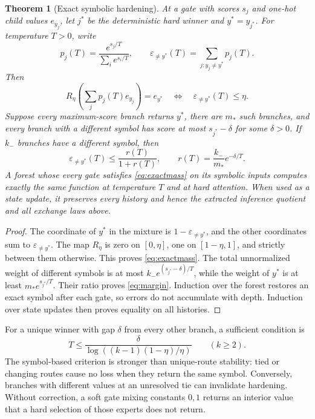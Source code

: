\documentclass{article}
\newtheorem{theorem}{Theorem}
\theoremstyle{definition}
\newcommand{\eps}{\varepsilon}
\begin{document}
\begin{theorem}[Exact symbolic hardening]\label{thm:hardening}
At a gate with scores $s_j$ and one-hot child values $e_{y_j}$, let $j^*$ be the deterministic hard winner and $y^*=y_{j^*}$. For temperature $T>0$, write
\begin{equation}
 p_j(T)=\frac{e^{s_j/T}}{\sum_i e^{s_i/T}},\qquad
 \eps_{\ne y^*}(T)=\sum_{j:y_j\ne y^*}p_j(T).
 \label{eq:wrongmass}
\end{equation}
Then
\begin{equation}
 R_\eta\left(\sum_jp_j(T)e_{y_j}\right)=e_{y^*}
 \quad\Longleftrightarrow\quad \eps_{\ne y^*}(T)\le\eta.
 \label{eq:exactmass}
\end{equation}
Suppose every maximum-score branch returns $y^*$, there are $m_*$ such branches, and every branch with a different symbol has score at most $s_{j^*}-\delta$ for some $\delta>0$. If $k_-$ branches have a different symbol, then
\begin{equation}
 \eps_{\ne y^*}(T)\le\frac{r(T)}{1+r(T)},\qquad
 r(T)=\frac{k_-}{m_*}e^{-\delta/T}.
 \label{eq:margin}
\end{equation}
A forest whose every gate satisfies \eqref{eq:exactmass} on its symbolic inputs computes exactly the same function at temperature $T$ and at hard attention. When used as a state update, it preserves every history and hence the extracted inference quotient and all exchange laws above.
\end{theorem}
\begin{proof}
The coordinate of $y^*$ in the mixture is $1-\eps_{\ne y^*}$, and the other coordinates sum to $\eps_{\ne y^*}$. The map $R_\eta$ is zero on $[0,\eta]$, one on $[1-\eta,1]$, and strictly between them otherwise. This proves \eqref{eq:exactmass}. The total unnormalized weight of different symbols is at most $k_-e^{(s_{j^*}-\delta)/T}$, while the weight of $y^*$ is at least $m_*e^{s_{j^*}/T}$. Their ratio proves \eqref{eq:margin}. Induction over the forest restores an exact symbol after each gate, so errors do not accumulate with depth. Induction over state updates then proves equality on all histories.
\end{proof}

For a unique winner with gap $\delta$ from every other branch, a sufficient condition is
\begin{equation}
 T\le\frac{\delta}{\log((k-1)(1-\eta)/\eta)}\qquad(k\ge2).
 \label{eq:temperature}
\end{equation}
The symbol-based criterion is stronger than unique-route stability: tied or changing routes cause no loss when they return the same symbol. Conversely, branches with different values at an unresolved tie can invalidate hardening. Without correction, a soft gate mixing constants $0,1$ returns an interior value that a hard selection of those experts does not return.
\end{document}

